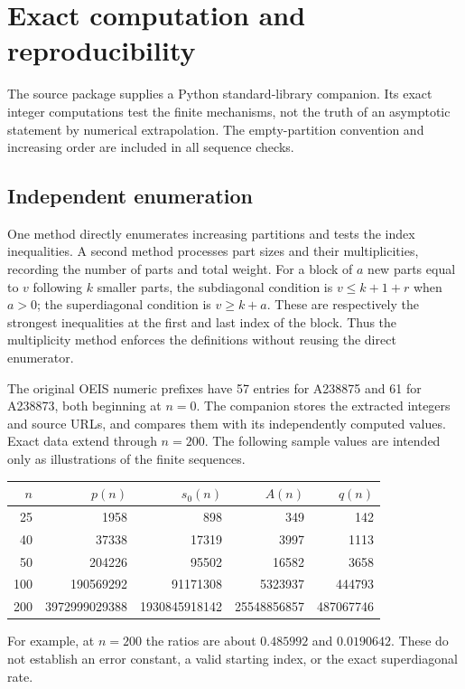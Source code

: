 \documentclass[11pt,letterpaper]{article}
\numberwithin{equation}{section}
\theoremstyle{remark}\newtheorem{remark}[theorem]{Remark}
\begin{document}
\section{Exact computation and reproducibility}\label{dgp:conj:sec:computation}
The source package supplies a Python standard-library companion.
Its exact integer computations test the finite mechanisms, not the
truth of an asymptotic statement by numerical extrapolation.
The empty-partition convention and increasing order are included
in all sequence checks.

\subsection{Independent enumeration}
One method directly enumerates increasing partitions and tests the
index inequalities. A second method processes part sizes and their
multiplicities, recording the number of parts and total weight.
For a block of $a$ new parts equal to $v$ following $k$ smaller
parts, the subdiagonal condition is $v\leq k+1+r$ when $a>0$;
the superdiagonal condition is $v\geq k+a$. These are respectively
the strongest inequalities at the first and last index of the
block. Thus the multiplicity method enforces the definitions
without reusing the direct enumerator.

The original OEIS numeric prefixes have 57 entries for A238875
and 61 for A238873, both beginning at $n=0$. The companion stores
the extracted integers and source URLs, and compares them with
its independently computed values. Exact data extend through
$n=200$. The following sample values are intended only as
illustrations of the finite sequences.
\begin{center}
\begin{tabular}{r r r r r}
\toprule
$n$ & $p(n)$ & $s_0(n)$ & $A(n)$ & $q(n)$\\
\midrule
25 & 1958 & 898 & 349 & 142\\
40 & 37338 & 17319 & 3997 & 1113\\
50 & 204226 & 95502 & 16582 & 3658\\
100 & 190569292 & 91171308 & 5323937 & 444793\\
200 & 3972999029388 & 1930845918142 & 25548856857 & 487067746\\
\bottomrule
\end{tabular}
\end{center}
For example, at $n=200$ the ratios are about $0.485992$ and
$0.0190642$. These do not establish an error constant, a valid
starting index, or the exact superdiagonal rate.
\end{document}
